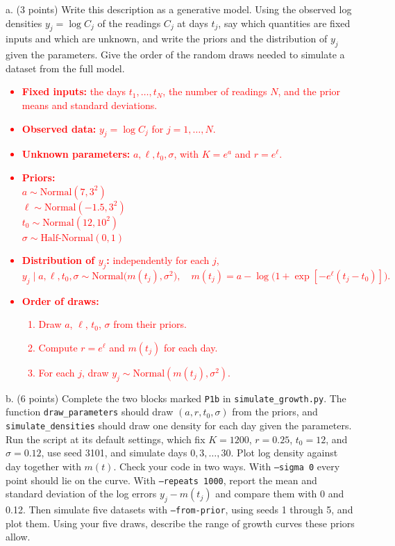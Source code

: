 \documentclass[11pt]{article}
\begin{document}
a. (3 points) Write this description as a generative model. Using the observed log densities
$y_j=\log C_j$ of the readings $C_j$ at days $t_j$, say which quantities are fixed inputs and which are unknown, and write the
priors and the distribution of $y_j$ given the parameters. Give the order of the random draws
needed to simulate a dataset from the full model.
\textcolor{red}{
\begin{itemize}
    \item \textbf{Fixed inputs:} the days $t_1,\dots,t_N$, the number of readings $N$, and the prior means and standard deviations.
    \item \textbf{Observed data:} $y_j = \log C_j$ for $j = 1,\dots,N$.
    \item \textbf{Unknown parameters:} $a, \ell, t_0, \sigma$, with $K = e^{a}$ and $r = e^{\ell}$.
    \item \textbf{Priors:}\\
        $a \sim \text{Normal}(7, 3^2)$\\
        $\ell \sim \text{Normal}(-1.5, 3^2)$\\
        $t_0 \sim \text{Normal}(12, 10^2)$\\
        $\sigma \sim \text{Half-Normal}(0, 1)$
    \item \textbf{Distribution of $y_j$:} independently for each $j$,
        \[ y_j \mid a, \ell, t_0, \sigma \sim \text{Normal}\big(m(t_j), \sigma^2\big), \quad m(t_j) = a - \log\big(1 + \exp[-e^{\ell}(t_j - t_0)]\big). \]
    \item \textbf{Order of draws:}
        \begin{enumerate}
            \item Draw $a$, $\ell$, $t_0$, $\sigma$ from their priors.
            \item Compute $r = e^{\ell}$ and $m(t_j)$ for each day.
            \item For each $j$, draw $y_j \sim \text{Normal}(m(t_j), \sigma^2)$.
        \end{enumerate}
\end{itemize}
}

b. (6 points) Complete the two blocks marked {\tt P1b} in {\tt simulate\_growth.py}. The function
{\tt draw\_parameters} should draw $(a,r,t_0,\sigma)$ from the priors, and
{\tt simulate\_densities} should draw one density for each day given the parameters. Run the
script at its default settings, which fix $K=1200$, $r=0.25$, $t_0=12$, and $\sigma=0.12$, use
seed 3101, and simulate days $0,3,\ldots,30$. Plot log density against day together with $m(t)$.
Check your code in two ways. With {\tt --sigma 0} every point should lie on the curve. With
{\tt --repeats 1000}, report the mean and standard deviation of the log errors $y_j-m(t_j)$ and
compare them with 0 and 0.12. Then simulate five datasets with {\tt --from-prior}, using seeds 1
through 5, and plot them. Using your five draws, describe the range of growth curves these priors
allow.
\end{document}
